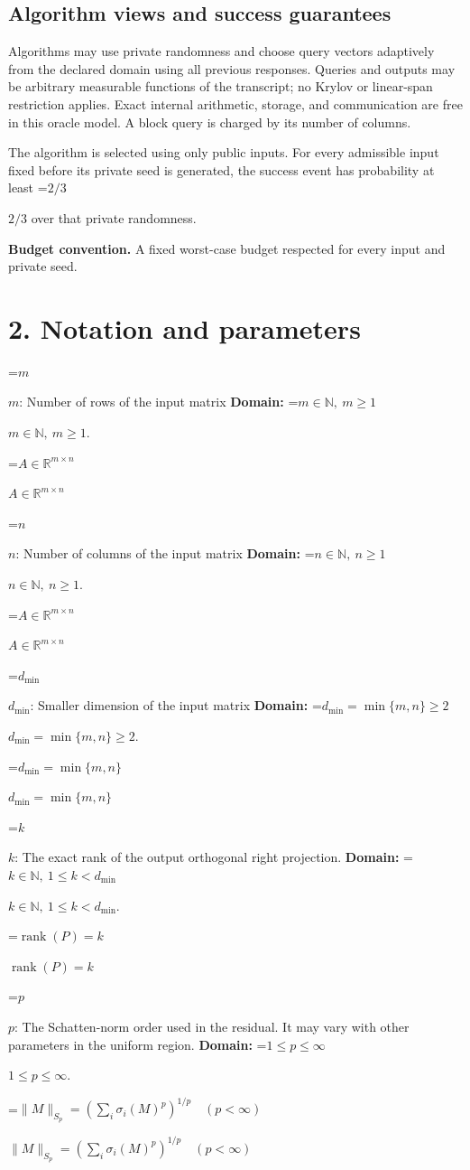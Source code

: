\documentclass[10pt,a4paper]{article}
\newcommand{\AtlasMath}[1]{\par\begingroup\centering\setbox0=\hbox{$\displaystyle #1$}\ifdim\wd0>1.4\linewidth\typeout{ATLAS WIDE FORMULA: \the\wd0}\fi\ifdim\wd0>\linewidth\resizebox{\linewidth}{!}{\box0}\else\box0\fi\par\endgroup}
\newcommand{\AtlasInlineMath}[1]{\begingroup\setbox0=\hbox{$#1$}\ifdim\wd0>.4\linewidth\endgroup\AtlasMath{#1}\else\endgroup$#1$\fi}
\begin{document}
\subsection{Algorithm views and success guarantees}
Algorithms may use private randomness and choose query vectors adaptively from the declared domain using all previous responses. Queries and outputs may be arbitrary measurable functions of the transcript; no Krylov or linear-span restriction applies. Exact internal arithmetic, storage, and communication are free in this oracle model. A block query is charged by its number of columns.

The algorithm is selected using only public inputs. For every admissible input fixed before its private seed is generated, the success event has probability at least \AtlasInlineMath{2/3} over that private randomness.

\textbf{Budget convention.} A fixed worst-case budget respected for every input and private seed.

\section{2. Notation and parameters}
\AtlasInlineMath{m}: Number of rows of the input matrix \textbf{Domain:} \AtlasInlineMath{m\in\mathbb N,\ m\ge1}.

\AtlasInlineMath{A\in\mathbb R^{m\times n}}

\AtlasInlineMath{n}: Number of columns of the input matrix \textbf{Domain:} \AtlasInlineMath{n\in\mathbb N,\ n\ge1}.

\AtlasInlineMath{A\in\mathbb R^{m\times n}}

\AtlasInlineMath{d_{\mathrm{min}}}: Smaller dimension of the input matrix \textbf{Domain:} \AtlasInlineMath{d_{\min}=\min\{m,n\}\ge2}.

\AtlasInlineMath{d_{\mathrm{min}}=\min\{m,n\}}

\AtlasInlineMath{k}: The exact rank of the output orthogonal right projection. \textbf{Domain:} \AtlasInlineMath{k\in\mathbb N,\ 1\le k<d_{\mathrm{min}}}.

\AtlasInlineMath{\operatorname{rank}(P)=k}

\AtlasInlineMath{p}: The Schatten-norm order used in the residual. It may vary with other parameters in the uniform region. \textbf{Domain:} \AtlasInlineMath{1\le p\le\infty}.

\AtlasInlineMath{\|M\|_{S_p}=(\sum_i\sigma_i(M)^p)^{1/p}\quad(p<\infty)}
\end{document}
